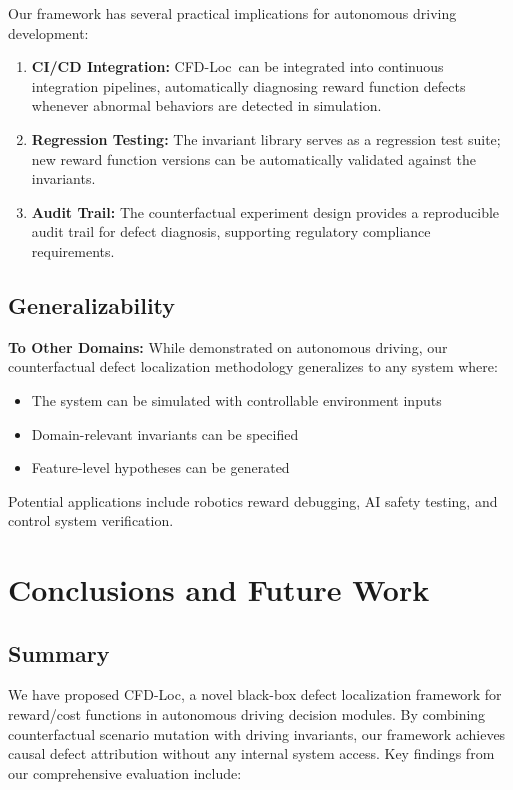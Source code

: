 \documentclass[conference]{IEEEtran}
\theoremstyle{plain}
\newcommand{\methodname}{CFD-Loc}
\begin{document}
Our framework has several practical implications for autonomous driving development:

\begin{enumerate}[nosep]
    \item \textbf{CI/CD Integration:} \methodname\ can be integrated into continuous integration pipelines, automatically diagnosing reward function defects whenever abnormal behaviors are detected in simulation.
    \item \textbf{Regression Testing:} The invariant library serves as a regression test suite; new reward function versions can be automatically validated against the invariants.
    \item \textbf{Audit Trail:} The counterfactual experiment design provides a reproducible audit trail for defect diagnosis, supporting regulatory compliance requirements.
\end{enumerate}

\subsection{Generalizability}

\textbf{To Other Domains:} While demonstrated on autonomous driving, our counterfactual defect localization methodology generalizes to any system where:
\begin{itemize}[nosep]
    \item The system can be simulated with controllable environment inputs
    \item Domain-relevant invariants can be specified
    \item Feature-level hypotheses can be generated
\end{itemize}
Potential applications include robotics reward debugging, AI safety testing, and control system verification.

\section{Conclusions and Future Work}
\label{sec:conclusion}

\subsection{Summary}

We have proposed \methodname, a novel black-box defect localization framework for reward/cost functions in autonomous driving decision modules. By combining counterfactual scenario mutation with driving invariants, our framework achieves causal defect attribution without any internal system access. Key findings from our comprehensive evaluation include:
\end{document}

